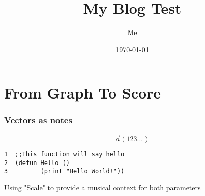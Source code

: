 \documentclass[11pt]{article}
\author{Me}
\date{\today}
\title{My Blog Test}
\begin{document}
\maketitle
\tableofcontents


\section{From Graph To Score}
\label{sec:org0aa2e01}



\subsubsection{Vectors as notes}
\label{sec:org4a9bc37}
\begin{equation}                       
\vec{a}(1 2 3 ...)                             
\end{equation} 

\begin{verbatim}
1  ;;This function will say hello
2  (defun Hello ()
3         (print "Hello World!"))
\end{verbatim}

Using "Scale" to provide a musical context for both parameters 
\end{document}
